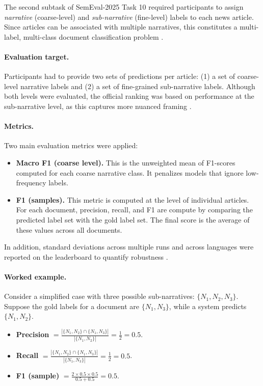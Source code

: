 The second subtask of SemEval-2025 Task 10 required participants to assign
\emph{narrative} (coarse-level) and \emph{sub-narrative} (fine-level) labels
to each news article. Since articles can be associated with multiple narratives,
this constitutes a multi-label, multi-class document classification problem
\cite{Piskorski2025}.

\paragraph{Evaluation target.}
Participants had to provide two sets of predictions per article:
(1) a set of coarse-level narrative labels and
(2) a set of fine-grained sub-narrative labels.
Although both levels were evaluated, the official ranking was based on performance at the sub-narrative level, as this captures more nuanced framing
\cite{propaganda_site2025}.

\paragraph{Metrics.}
Two main evaluation metrics were applied:
\begin{itemize}
  \item \textbf{Macro F1 (coarse level).}
  This is the unweighted mean of F1-scores computed for each coarse narrative class. It penalizes models that ignore low-frequency labels.
  \item \textbf{F1 (samples).}
  This metric is computed at the level of individual articles. For each document, precision, recall, and F1 are compute by comparing the predicted label set with the gold label set. The final score is the average of these values across all documents.
\end{itemize}
In addition, standard deviations across multiple runs and across languages were reported on the leaderboard to quantify robustness \cite{leaderboard2025}.

\paragraph{Worked example.}
Consider a simplified case with three possible sub-narratives:
$\{N_{1}, N_{2}, N_{3}\}$.
Suppose the gold labels for a document are $\{N_{1}, N_{3}\}$,
while a system predicts $\{N_{1}, N_{2}\}$.

\begin{itemize}
  \item \textbf{Precision} $= \frac{|\{N_{1}, N_{2}\} \cap \{N_{1}, N_{3}\}|}
  {|\{N_{1}, N_{2}\}|} = \frac{1}{2} = 0.5$.
  \item \textbf{Recall} $= \frac{|\{N_{1}, N_{2}\} \cap \{N_{1}, N_{3}\}|}
  {|\{N_{1}, N_{3}\}|} = \frac{1}{2} = 0.5$.
  \item \textbf{F1 (sample)} $= \frac{2 \times 0.5 \times 0.5}{0.5 + 0.5} = 0.5$.
\end{itemize}

